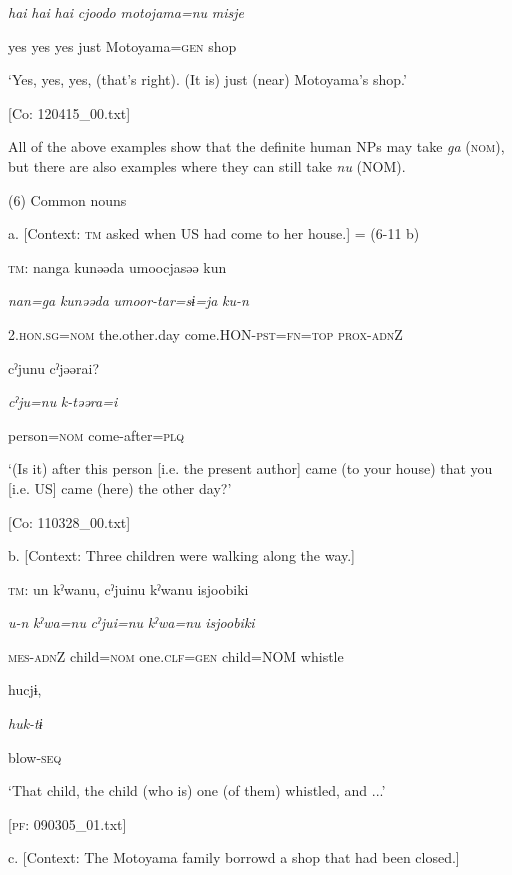       \textit{hai}  \textit{hai}  \textit{hai}  \textit{cjoodo}  \textit{motojama=nu}  \textit{misje}

      yes  yes  yes  just  Motoyama=\textsc{gen}  shop

      ‘Yes, yes, yes, (that’s right). (It is) just (near) Motoyama’s shop.’

      [Co: 120415\_00.txt]

  All of the above examples show that the definite human NPs may take \textit{ga} (\textsc{nom}), but there are also examples where they can still take \textit{nu} (NOM).

(6)  Common nouns

  a.  [Context: \textsc{tm} asked when US had come to her house.] = (6-11 b)

    \textsc{tm}:  nanga  kunəəda  umoocjasəə  kun

      \textit{nan=ga}  \textit{kunəəda}  \textit{umoor-tar=sɨ=ja}  \textit{ku-n}

      2.\textsc{hon}.\textsc{sg}=\textsc{nom}  the.other.day  come.HON-\textsc{pst}=\textsc{fn}=\textsc{top}  \textsc{prox}-\textsc{adn}Z

      cˀjunu  cˀjəərai?

      \textit{cˀju=nu}  \textit{k-təəra=i}

      person=\textsc{nom}  come-after=\textsc{plq}

      ‘(Is it) after this person [i.e. the present author] came (to your house) that you [i.e. US] came (here) the other day?’

      [Co: 110328\_00.txt]

  b.  [Context: Three children were walking along the way.]

    \textsc{tm}:  un  kˀwanu,  cˀjuinu  kˀwanu  isjoobiki

      \textit{u-n}  \textit{kˀwa=nu}  \textit{cˀjui=nu}  \textit{kˀwa=nu}  \textit{isjoobiki}

      \textsc{mes}-\textsc{adn}Z  child=\textsc{nom}  one.\textsc{clf}=\textsc{gen}  child=NOM  whistle

      hucjɨ,

      \textit{huk-tɨ}

      blow-\textsc{seq}

      ‘That child, the child (who is) one (of them) whistled, and ...’

      [\textsc{pf}: 090305\_01.txt]

  c.  [Context: The Motoyama family borrowd a shop that had been closed.]

